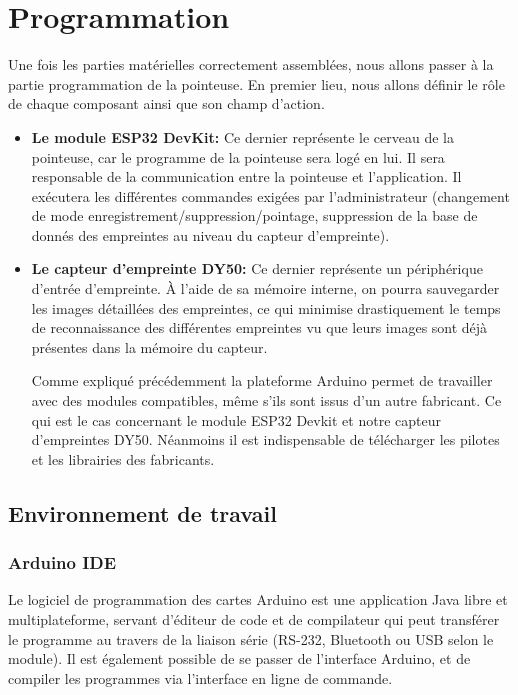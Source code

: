 \section{Programmation}
Une fois les parties matérielles correctement assemblées, nous allons passer à 
la partie programmation de la pointeuse. En premier lieu, nous allons définir 
le rôle de chaque composant ainsi que son champ d’action.

\begin{itemize}
    \item[\textbullet] \textbf{Le module ESP32 DevKit:} Ce dernier représente le
        cerveau de la pointeuse, car le programme de la pointeuse sera logé en
        lui. Il sera responsable de la communication entre la pointeuse et
        l’application. Il exécutera les différentes commandes exigées par
        l’administrateur (changement de mode
        enregistrement/suppression/pointage, suppression de la base de donnés
        des empreintes au niveau du capteur d’empreinte).  
    \item[\textbullet] \textbf{Le capteur d'empreinte DY50:} Ce dernier
        représente un périphérique d’entrée d’empreinte. À l’aide de sa mémoire
        interne, on pourra sauvegarder les images détaillées des empreintes, ce
        qui minimise drastiquement le temps de reconnaissance des différentes
        empreintes vu que leurs images sont déjà présentes dans la mémoire du
        capteur.

        Comme expliqué précédemment la plateforme Arduino permet de travailler
        avec des modules compatibles, même s’ils sont issus d’un autre
        fabricant. Ce qui est le cas concernant le module ESP32 Devkit et notre
        capteur d’empreintes DY50.  Néanmoins il est indispensable de
        télécharger les pilotes et les librairies des fabricants.    
\end{itemize}

\subsection{Environnement de travail}

\subsubsection{Arduino IDE }
Le logiciel de programmation des cartes Arduino est une application Java libre 
et multiplateforme, servant d'éditeur de code et de compilateur qui peut 
transférer le programme au travers de la liaison série (RS-232, Bluetooth ou USB 
selon le module). Il est également possible de se passer de l'interface Arduino, 
et de compiler les programmes via l'interface en ligne de commande.

